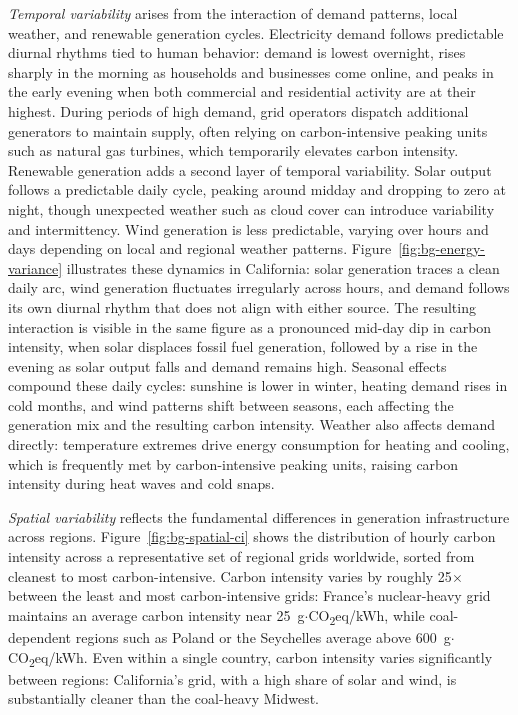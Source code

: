 \textit{Temporal variability} arises from the interaction of demand patterns, local weather, and renewable generation cycles.
Electricity demand follows predictable diurnal rhythms tied to human behavior: demand is lowest overnight, rises sharply in the morning as households and businesses come online, and peaks in the early evening when both commercial and residential activity are at their highest.
During periods of high demand, grid operators dispatch additional generators to maintain supply, often relying on carbon-intensive peaking units such as natural gas turbines, which temporarily elevates carbon intensity.
Renewable generation adds a second layer of temporal variability.
Solar output follows a predictable daily cycle, peaking around midday and dropping to zero at night, though unexpected weather such as cloud cover can introduce variability and intermittency.
Wind generation is less predictable, varying over hours and days depending on local and regional weather patterns.
Figure~\ref{fig:bg-energy-variance} illustrates these dynamics in California: solar generation traces a clean daily arc, wind generation fluctuates irregularly across hours, and demand follows its own diurnal rhythm that does not align with either source.
The resulting interaction is visible in the same figure as a pronounced mid-day dip in carbon intensity, when solar displaces fossil fuel generation, followed by a rise in the evening as solar output falls and demand remains high.
Seasonal effects compound these daily cycles: sunshine is lower in winter, heating demand rises in cold months, and wind patterns shift between seasons, each affecting the generation mix and the resulting carbon intensity.
Weather also affects demand directly: temperature extremes drive energy consumption for heating and cooling, which is frequently met by carbon-intensive peaking units, raising carbon intensity during heat waves and cold snaps.

\textit{Spatial variability} reflects the fundamental differences in generation infrastructure across regions.
Figure~\ref{fig:bg-spatial-ci} shows the distribution of hourly carbon intensity across a representative set of regional grids worldwide, sorted from cleanest to most carbon-intensive.
Carbon intensity varies by roughly 25$\times$ between the least and most  carbon-intensive grids: France's nuclear-heavy grid maintains an average carbon intensity near 25~g$\cdot$CO\textsubscript{2}eq/kWh, while coal-dependent regions such as Poland or the Seychelles average above 600~g$\cdot$CO\textsubscript{2}eq/kWh.
Even within a single country, carbon intensity varies significantly between regions: California's grid, with a high share of solar and wind, is substantially cleaner than the coal-heavy Midwest.

